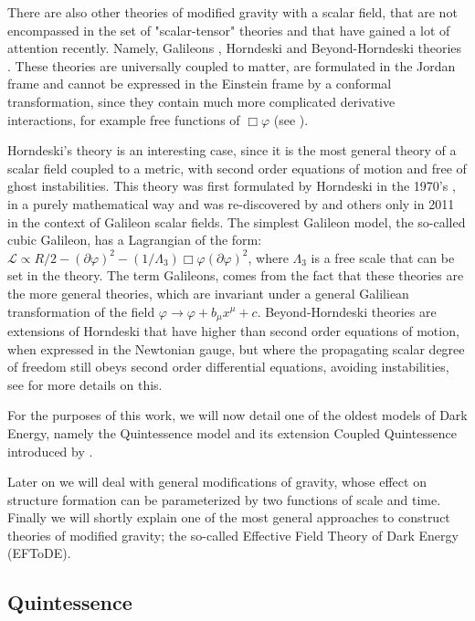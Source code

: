 There are also other theories of modified gravity with a scalar field, that are not encompassed in the set of "scalar-tensor"
theories and that have gained a lot of attention recently. Namely, Galileons \cite{cite}, Horndeski \cite{cite} 
and Beyond-Horndeski theories \cite{cite}. 
These theories are universally coupled to matter, are formulated
in the Jordan frame and cannot be expressed in the Einstein frame by a conformal transformation, since they contain much more complicated
derivative interactions, for example free functions of $\Box \varphi$ (see \cite{cite Zuma, Defayyet, Sawicki, Bellini}).

Horndeski's theory is an interesting case, since it is the most general theory of 
a scalar field coupled to a metric, with second order equations of motion and free of ghost instabilities. 
This theory was first formulated by Horndeski in the 1970's \cite{Horndeski}, in a purely mathematical way and was re-discovered by \cite{Defayett}
and others only in 2011 in the context of Galileon scalar fields. The simplest Galileon model, the so-called cubic Galileon, has a Lagrangian of the form:
$\mathcal{L} \propto R/2 - (\partial \varphi)^2 - (1/\Lambda_3)\Box \varphi (\partial \varphi)^2$, 
where $ \Lambda_3 $ is a free scale that can be set in the theory. The term Galileons, comes from the fact that
these theories are the more general theories, which are invariant under a general Galiliean transformation of the field $\varphi \rightarrow \varphi + b_\mu x^\mu +c$.
Beyond-Horndeski theories are extensions of Horndeski that have higher than second order equations of motion, when expressed 
in the Newtonian gauge, but where the propagating scalar degree of freedom still obeys second order differential equations, avoiding
instabilities, see
\cite{cite Langlois, Gleyzes, Zuma} for more details on this.

For the purposes of this work, we will now detail one of the oldest models of Dark Energy, namely
the Quintessence model \cite{Ratra-Peebles; Christof} and its extension
Coupled Quintessence introduced by \cite{Amendola_2000}.

Later on we will deal with general modifications of gravity, whose
effect on structure formation can be parameterized by two functions of
scale and time. Finally we will shortly explain one of the most general approaches
to construct theories of modified gravity; the so-called Effective Field Theory of Dark Energy (EFToDE).

\subsection{Quintessence \label{sub:quintessence}}

